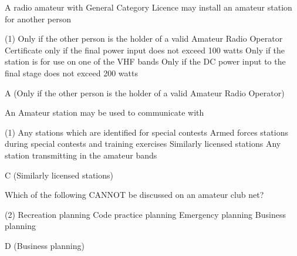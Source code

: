 \documentclass[a4paper]{article}
\begin{document}
\begin{question}A radio amateur with General Category Licence may install an amateur station for another person
	\begin{tasks}(1)
		\task Only if the other person is the holder of a valid Amateur Radio Operator
		\task Certificate only if the final power input does not exceed 100 watts
		\task Only if the station is for use on one of the VHF bands
		\task Only if the DC power input to the final stage does not exceed 200 watts
	\end{tasks}
\end{question}

\begin{solution}
	A (Only if the other person is the holder of a valid Amateur Radio Operator)
\end{solution}

\vspace{5mm}



\begin{question}An Amateur station may be used to communicate with
	\begin{tasks}(1)
		\task Any stations which are identified for special contests
		\task Armed forces stations during special contests and training exercises
		\task Similarly licensed stations
		\task Any station transmitting in the amateur bands
	\end{tasks}
\end{question}

\begin{solution}
	C (Similarly licensed stations)
\end{solution}

\vspace{5mm}



\begin{question}Which of the following CANNOT be discussed on an amateur club net?
	\begin{tasks}(2)
		\task Recreation planning
		\task Code practice planning
		\task Emergency planning
		\task Business planning
	\end{tasks}
\end{question}

\begin{solution}
	D (Business planning)
\end{solution}

\vspace{5mm}
\end{document}
